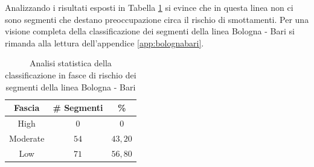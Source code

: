 \newline
Analizzando i risultati esposti in Tabella \ref{percentualebolognabari} si evince che in questa linea non ci sono segmenti che destano preoccupazione circa il rischio di smottamenti. 
Per una visione completa della classificazione dei segmenti della linea Bologna - Bari si rimanda alla lettura dell'appendice \ref{app:bolognabari}.
\begin{table}[h]
\centering
\begin{tabular}{|c|c|c|}
\hline \rowcolor{lightgray}
Fascia   & \# Segmenti & \%    \\ \hline \rowcolor{flamingopink}
High     & $0$           & $0$     \\ \hline \rowcolor{icterine}
Moderate & $54$          & $43,20$ \\ \hline \rowcolor{inchworm}
Low      & $71$          & $56,80$ \\ \hline
\end{tabular}
\caption{Analisi statistica della classificazione in fasce di rischio dei segmenti della linea Bologna - Bari}
\label{percentualebolognabari}
\end{table}

\newpage
